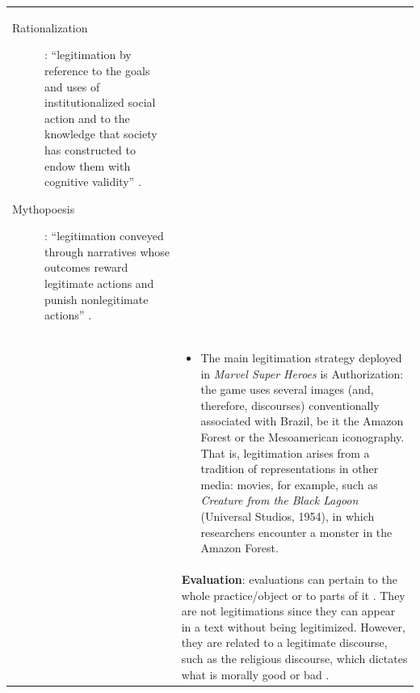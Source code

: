 \documentclass[english]{textolivre}
\begin{document}
\begin{small}
\begin{longtable}{
    >{\raggedright\arraybackslash}p{} 
    >{\raggedright\arraybackslash}p{}  
    }
\begin{description}
    \item[Rationalization]: “legitimation by reference to the goals and uses of institutionalized social action and to the knowledge that society has constructed to endow them with cognitive validity” \cites[p. 106]{van_leeuwen_discourse_2008}.
    \item[Mythopoesis]: “legitimation conveyed through narratives whose outcomes reward legitimate actions and punish nonlegitimate actions” \cites[p. 106]{van_leeuwen_discourse_2008}.
\end{description}
\parfillskip=0pt \tabularnewline
&\begin{itemize}
    \item The main legitimation strategy deployed in \textit{Marvel Super Heroes} is Authorization: the game uses several images (and, therefore, discourses) conventionally associated with Brazil, be it the Amazon Forest or the Mesoamerican iconography. That is, legitimation arises from a tradition \cites[p. 108]{van_leeuwen_discourse_2008} of representations in other media: movies, for example, such as \textit{Creature from the Black Lagoon} (Universal Studios, 1954), in which researchers encounter a monster in the Amazon Forest.
\end{itemize}
\\
 & 
\textbf{Evaluation}: evaluations can pertain to the whole practice/object or to parts of it \cites[p. 21]{van_leeuwen_discourse_2008}. They are not legitimations since they can appear in a text without being legitimized. However, they are related to a legitimate discourse, such as the religious discourse, which dictates what is morally good or bad \cites[p. 21]{van_leeuwen_discourse_2008}.


\end{longtable}
\end{small}
\end{document}
